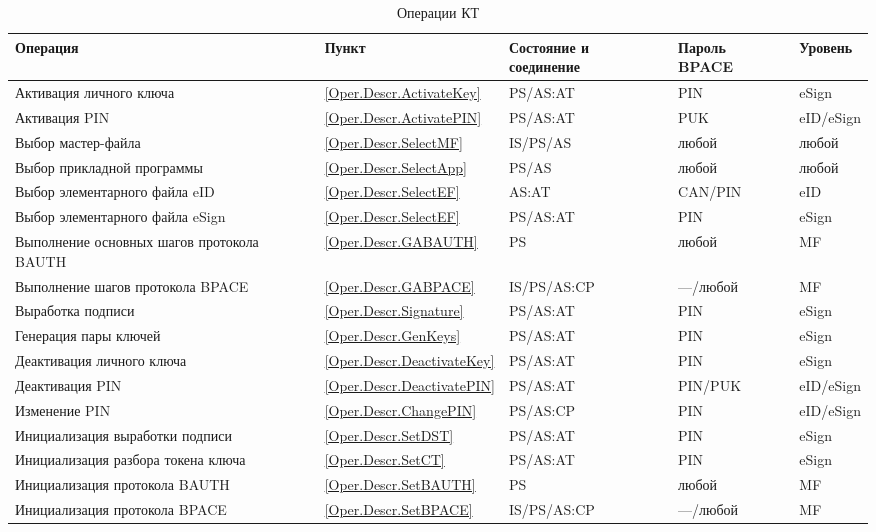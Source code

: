 \begin{table}[h!]
\caption{Операции КТ}
\label{Table.Oper.List}
\begin{tabular}{|p{7.5cm}|p{1.3cm}|p{2.6cm}|p{1.8cm}| p{1.7cm}|}
\hline
Операция & Пункт & Состояние и соединение & Пароль BPACE & Уровень \\
\hline
\hline
Активация личного ключа & \ref{Oper.Descr.ActivateKey} & PS/AS:AT & PIN & eSign\\ 
\hline
Активация PIN & \ref{Oper.Descr.ActivatePIN} & PS/AS:AT & PUK & eID/eSign\\
\hline
Выбор мастер-файла & \ref{Oper.Descr.SelectMF} & IS/PS/AS & любой & любой\\
\hline
Выбор прикладной программы & \ref{Oper.Descr.SelectApp} & PS/AS & любой & любой\\ 
\hline
Выбор элементарного файла eID & \ref{Oper.Descr.SelectEF} & AS:AT & CAN/PIN & 
eID \\ 
\hline
Выбор элементарного файла eSign & \ref{Oper.Descr.SelectEF} & PS/AS:AT & PIN & 
eSign \\ 
\hline
Выполнение основных шагов протокола BAUTH & \ref{Oper.Descr.GABAUTH} & PS & 
любой & MF \\ 
\hline
Выполнение шагов протокола BPACE & \ref{Oper.Descr.GABPACE} & IS/PS/AS:CP & 
---/любой & MF \\ 
\hline
Выработка подписи & \ref{Oper.Descr.Signature} & PS/AS:AT & PIN & eSign \\
\hline
Генерация пары ключей & \ref{Oper.Descr.GenKeys} & PS/AS:AT & PIN & eSign \\
\hline
Деактивация личного ключа & \ref{Oper.Descr.DeactivateKey}  & PS/AS:AT & PIN & 
eSign\\ 
\hline
Деактивация PIN & \ref{Oper.Descr.DeactivatePIN}  & PS/AS:AT & PIN/PUK & 
eID/eSign\\ 
\hline
Изменение PIN & \ref{Oper.Descr.ChangePIN} & PS/AS:CP & PIN & eID/eSign \\
\hline
Инициализация выработки подписи & \ref{Oper.Descr.SetDST} & PS/AS:AT 
& PIN & eSign \\ 
\hline
Инициализация разбора токена ключа & \ref{Oper.Descr.SetCT} & 
PS/AS:AT & PIN & eSign \\ 
\hline
Инициализация протокола BAUTH & \ref{Oper.Descr.SetBAUTH} & PS & любой & MF \\ 
\hline
Инициализация протокола BPACE & \ref{Oper.Descr.SetBPACE} & IS/PS/AS:CP & 
---/любой & MF \\ 

\end{tabular}
\end{table}

